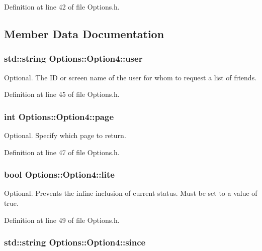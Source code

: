 Definition at line 42 of file Options.h.

\subsection{Member Data Documentation}
\hypertarget{structOptions_1_1Option4_f649f812e432689a3325dbd15a0945b3}{
\subsubsection{\setlength{\rightskip}{0pt plus 5cm}std::string {\bf Options::Option4::user}}}
\label{structOptions_1_1Option4_f649f812e432689a3325dbd15a0945b3}


Optional. The ID or screen name of the user for whom to request a list of friends. 



Definition at line 45 of file Options.h.\hypertarget{structOptions_1_1Option4_2cd219e536ea8d03a734b4cd91a4b146}{
\subsubsection{\setlength{\rightskip}{0pt plus 5cm}int {\bf Options::Option4::page}}}
\label{structOptions_1_1Option4_2cd219e536ea8d03a734b4cd91a4b146}


Optional. Specify which page to return. 



Definition at line 47 of file Options.h.\hypertarget{structOptions_1_1Option4_f417267bbe5eb7368b9b0f820eabe617}{
\subsubsection{\setlength{\rightskip}{0pt plus 5cm}bool {\bf Options::Option4::lite}}}
\label{structOptions_1_1Option4_f417267bbe5eb7368b9b0f820eabe617}


Optional. Prevents the inline inclusion of current status. Must be set to a value of true. 



Definition at line 49 of file Options.h.\hypertarget{structOptions_1_1Option4_56a504649fb129f628e3b99fb6bb6985}{
\subsubsection{\setlength{\rightskip}{0pt plus 5cm}std::string {\bf Options::Option4::since}}}
\label{structOptions_1_1Option4_56a504649fb129f628e3b99fb6bb6985}



